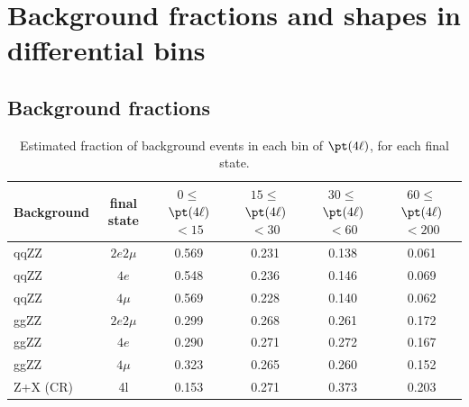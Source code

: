 \section{Background fractions and shapes in differential bins}

\subsection[Background fractions]{Background fractions} \label{app:bkginputs_fractions}

\begin{table}[!h!tb]  
\begin{center}  
\small  
    \caption{  
        Estimated fraction of background events in each bin of $\pt(4\ell)$, for each final state.  
\label{tab:fractions_pT4l}  
}  
\begin{tabular}{|l|c|c|c|c|c|}  
\hline  
Background & final state & $0\leq$$\pt(4\ell)$$<15$ & $15\leq$$\pt(4\ell)$$<30$ & $30\leq$$\pt(4\ell)$$<60$ & $60\leq$$\pt(4\ell)$$<200$ \\ \hline  
qqZZ& $2e2\mu$  & 0.569  & 0.231  & 0.138  & 0.061  \\  
qqZZ& $4e$  & 0.548  & 0.236  & 0.146  & 0.069  \\  
qqZZ& $4\mu$  & 0.569  & 0.228  & 0.140  & 0.062  \\  
ggZZ& $2e2\mu$  & 0.299  & 0.268  & 0.261  & 0.172  \\  
ggZZ& $4e$  & 0.290  & 0.271  & 0.272  & 0.167  \\  
ggZZ& $4\mu$  & 0.323  & 0.265  & 0.260  & 0.152  \\  
Z+X (CR)& 4l  & 0.153  & 0.271  & 0.373  & 0.203  \\  
\hline  
\end{tabular}  
\normalsize  
\end{center}  
\end{table}  

